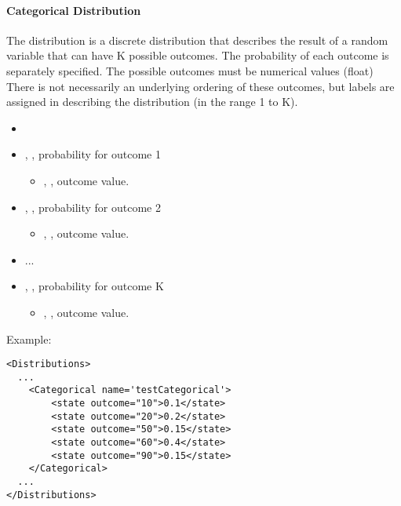 \paragraph{Categorical Distribution}
\label{Categorical}
The  distribution is a discrete distribution  that describes the result of a random variable that can have K possible outcomes. The probability of each outcome is separately specified.
The possible outcomes must be numerical values (float)
%
There is not necessarily an underlying ordering of these outcomes, but labels are assigned in describing the distribution (in the range 1 to K).
%
%
\attrIntro
\vspace{-5mm}
\begin{itemize}
  \itemsep0em
  \item \nameDescription
\end{itemize}
\vspace{-5mm}
\subnodeIntro
\begin{itemize}
  \item {}, , probability for outcome 1
  \begin{itemize}
          \item {}, , outcome value.
  \end{itemize}
  \item {}, , probability for outcome 2
  \begin{itemize}
          \item {}, , outcome value.
  \end{itemize}
  \item ...
  \item {}, , probability for outcome K
  \begin{itemize}
          \item {}, , outcome value.
  \end{itemize}
 \end{itemize}
Example:
\begin{lstlisting}[style=XML]
<Distributions>
  ...
    <Categorical name='testCategorical'>
        <state outcome="10">0.1</state>
        <state outcome="20">0.2</state>
        <state outcome="50">0.15</state>
        <state outcome="60">0.4</state>
        <state outcome="90">0.15</state>
    </Categorical>
  ...
</Distributions>
\end{lstlisting}


